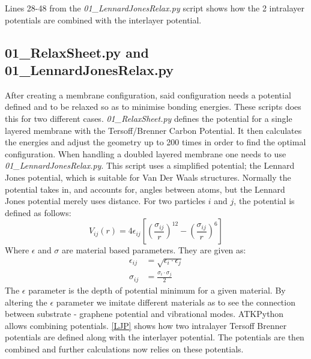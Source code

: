 \begin{listing}[H]
 \inputminted[python3=true,bgcolor=Black,linenos=true,firstline=28,lastline=48]{python}{VNL/PythonScripts/Scripts/01_LennardJonesRelax.py}
 \caption{Lines 28-48 from the \textit{01\_LennardJonesRelax.py} script shows how the 2 intralayer potentials are combined with the interlayer potential.}
 \label{LJP}
\end{listing}
\twocolumngrid
\subsection{01\_RelaxSheet.py and 01\_LennardJonesRelax.py}\label{01}
After creating a membrane configuration, said configuration needs a potential defined and to be relaxed so as to minimise bonding energies. These scripts does this for two different cases. \textit{01\_RelaxSheet.py} defines the potential for a single layered membrane with the Tersoff/Brenner Carbon Potential\cite{Lindsay2010}. It then calculates the energies and adjust the geometry up to 200 times in order to find the optimal configuration. When handling a doubled layered membrane one needs to use \textit{01\_LennardJonesRelax.py}. This script uses a simplified potential; the Lennard Jones potential, which is suitable for Van Der Waals structures. Normally the potential takes in, and accounts for, angles between atoms, but the Lennard Jones potential merely uses distance. For two particles $i$ and $j$, the potential is defined as follows:
\begin{equation}
  V_{ij}(r) = 4 \epsilon_{ij} \left[ \left( \frac{\sigma_{ij}}{r} \right) ^{12} - \left( \frac{\sigma_{ij}}{r} \right) ^6 \right]
\end{equation}
Where $\epsilon$ and $\sigma$ are material based parameters. They are given as:
\begin{align}
  \epsilon_{ij} & = \sqrt{\epsilon_i \cdot \epsilon_j} \\
  \sigma_{ij} & = \frac{\sigma_i \cdot \sigma_j}{2}
\end{align}
The $\epsilon$ parameter is the depth of potential minimum for a given material.
By altering the $\epsilon$ parameter we imitate different materials as to see the connection between substrate - graphene potential and vibrational modes.
ATKPython allows combining potentials. \cref{LJP} shows how two intralayer Tersoff Brenner potentials are defined along with the interlayer potential. The potentials are then combined and further calculations now relies on these potentials.
